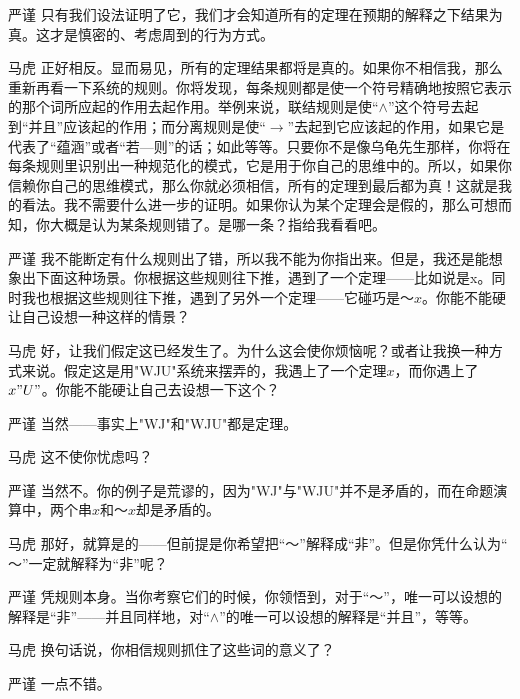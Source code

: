 \begin{dialogue}[labelwidth=2\ccwd, leftmargin=3\ccwd, topsep=\medskipamount]
\item[严谨]只有我们设法证明了它，我们才会知道所有的定理在预期的解释之下结果为真。这才是慎密的、考虑周到的行为方式。

\item[马虎]正好相反。显而易见，所有的定理结果都将是真的。如果你不相信我，那么重新再看一下系统的规则。你将发现，每条规则都是使一个符号精确地按照它表示的那个词所应起的作用去起作用。举例来说，联结规则是使“$∧$”这个符号去起到“并且”应该起的作用；而分离规则是使“$→$”去起到它应该起的作用，如果它是代表了“蕴涵”或者“若—则”的话；如此等等。只要你不是像乌龟先生那样，你将在每条规则里识别出一种规范化的模式，它是用于你自己的思维中的。所以，如果你信赖你自己的思维模式，那么你就必须相信，所有的定理到最后都为真！这就是我的看法。我不需要什么进一步的证明。如果你认为某个定理会是假的，那么可想而知，你大概是认为某条规则错了。是哪一条？指给我看看吧。

\item[严谨]我不能断定有什么规则出了错，所以我不能为你指出来。但是，我还是能想象出下面这种场景。你根据这些规则往下推，遇到了一个定理——比如说是x。同时我也根据这些规则往下推，遇到了另外一个定理——它碰巧是$～x$。你能不能硬让自己设想一种这样的情景？

\item[马虎]好，让我们假定这已经发生了。为什么这会使你烦恼呢？或者让我换一种方式来说。假定这是用"WJU"系统来摆弄的，我遇上了一个定理$x$，而你遇上了$x"U"$。你能不能硬让自己去设想一下这个？

\item[严谨]当然——事实上"WJ"和"WJU"都是定理。

\item[马虎]这不使你忧虑吗？

\item[严谨]当然不。你的例子是荒谬的，因为"WJ"与"WJU"并不是矛盾的，而在命题演算中，两个串$x$和$～x$却是矛盾的。

\item[马虎]那好，就算是的——但前提是你希望把“$～$”解释成“非”。但是你凭什么认为“$～$”一定就解释为“非”呢？

\item[严谨]凭规则本身。当你考察它们的时候，你领悟到，对于“$～$”，唯一可以设想的解释是“非”——并且同样地，对“$∧$”的唯一可以设想的解释是“并且”，等等。

\item[马虎]换句话说，你相信规则抓住了这些词的意义了？

\item[严谨]一点不错。


\end{dialogue}
